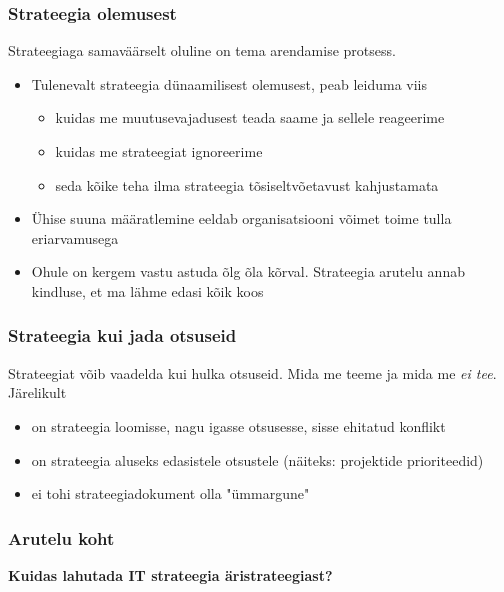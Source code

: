 \begin{frame}[fragile]
  \frametitle{Strateegia olemusest}
  Strateegiaga samaväärselt oluline on tema arendamise protsess. 
	\begin{itemize}
		\item Tulenevalt strateegia dünaamilisest olemusest, peab leiduma viis
		\begin{itemize}
			\item kuidas me muutusevajadusest teada saame ja sellele reageerime
			\item kuidas me strateegiat ignoreerime
			\item seda kõike teha ilma strateegia tõsiseltvõetavust kahjustamata
		\end{itemize}
		\item Ühise suuna määratlemine eeldab organisatsiooni võimet toime tulla eriarvamusega
		\item Ohule on kergem vastu astuda õlg õla kõrval. Strateegia arutelu annab kindluse, et ma lähme edasi kõik koos
	\end{itemize}
\end{frame}

\begin{frame}[fragile]
  \frametitle{Strateegia kui jada otsuseid}
	Strateegiat võib vaadelda kui hulka otsuseid. Mida me teeme ja mida me \emph{ei tee}. Järelikult
	\begin{itemize}
		\item on strateegia loomisse, nagu igasse otsusesse, sisse ehitatud konflikt
		\item on strateegia aluseks edasistele otsustele (näiteks: projektide prioriteedid)
		\item ei tohi strateegiadokument olla "ümmargune"
	\end{itemize}
\end{frame}


\begin{frame}[fragile]
  \frametitle{Arutelu koht}
		\begin{center}
			\textbf{Kuidas lahutada IT strateegia äristrateegiast?}
		\end{center}
\end{frame}

